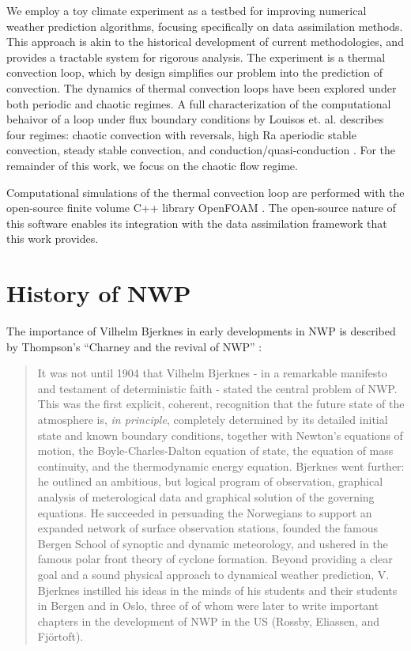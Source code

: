 \documentclass[12pt]{report}
\begin{document}
We employ a toy climate experiment as a testbed for improving numerical weather prediction algorithms, focusing specifically on data assimilation methods.
This approach is akin to the historical development of current methodologies, and provides a tractable system for rigorous analysis.
The experiment is a thermal convection loop, which by design simplifies our problem into the prediction of convection.
The dynamics of thermal convection loops have been explored under both periodic  and chaotic  regimes.
A full characterization of the computational behaivor of a loop under flux boundary conditions by Louisos et. al. describes four regimes: chaotic convection with reversals, high Ra aperiodic stable convection, steady stable convection, and conduction/quasi-conduction .
For the remainder of this work, we focus on the chaotic flow regime.

Computational simulations of the thermal convection loop are performed with the open-source finite volume C++ library OpenFOAM .
The open-source nature of this software enables its integration with the data assimilation framework that this work provides.

\section{History of NWP}

The importance of Vilhelm Bjerknes in early developments in NWP is described by Thompson's ``Charney and the revival of NWP'' :

\begin{quote}
It was not until 1904 that Vilhelm Bjerknes - in a remarkable manifesto and testament of deterministic faith - stated the central problem of NWP.
This was the first explicit, coherent, recognition that the future state of the atmosphere is, \emph{in principle}, completely determined by its detailed initial state and known boundary conditions, together with Newton's equations of motion, the Boyle-Charles-Dalton equation of state, the equation of mass continuity, and the thermodynamic energy equation.
Bjerknes went further: he outlined an ambitious, but logical program of observation, graphical analysis of meterological data and graphical solution of the governing equations.
He succeeded in persuading the Norwegians to support an expanded network of surface observation stations, founded the famous Bergen School of synoptic and dynamic meteorology, and ushered in the famous polar front theory of cyclone formation.
Beyond providing a clear goal and a sound physical approach to dynamical weather prediction, V. Bjerknes instilled his ideas in the minds of his students and their students in Bergen and in Oslo, three of of whom were later to write important chapters in the development of NWP in the US (Rossby, Eliassen, and Fj\"{o}rtoft).
\end{quote}
\end{document}
